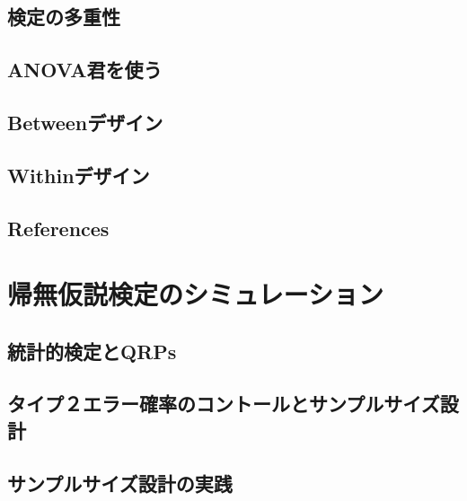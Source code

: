 \documentclass[
  a4paper,
]{ltjsbook}
\begin{document}
\section{検定の多重性}\label{ux691cux5b9aux306eux591aux91cdux6027}

\section{ANOVA君を使う}\label{anovaux541bux3092ux4f7fux3046}

\section{Betweenデザイン}\label{betweenux30c7ux30b6ux30a4ux30f3}

\section{Withinデザイン}\label{withinux30c7ux30b6ux30a4ux30f3}

\section{References}\label{references-8}



\chapter{帰無仮説検定のシミュレーション}\label{ux5e30ux7121ux4eeeux8aacux691cux5b9aux306eux30b7ux30dfux30e5ux30ecux30fcux30b7ux30e7ux30f3}

\section{統計的検定とQRPs}\label{ux7d71ux8a08ux7684ux691cux5b9aux3068qrps}

\section{タイプ２エラー確率のコントールとサンプルサイズ設計}\label{ux30bfux30a4ux30d7uxff12ux30a8ux30e9ux30fcux78baux7387ux306eux30b3ux30f3ux30c8ux30fcux30ebux3068ux30b5ux30f3ux30d7ux30ebux30b5ux30a4ux30baux8a2dux8a08}

\section{サンプルサイズ設計の実践}\label{ux30b5ux30f3ux30d7ux30ebux30b5ux30a4ux30baux8a2dux8a08ux306eux5b9fux8df5}
\end{document}
